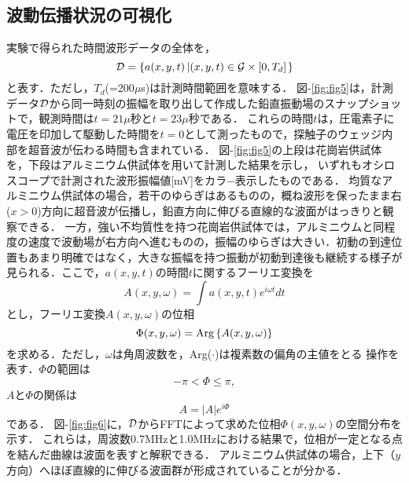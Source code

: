 ﻿%
\subsection{波動伝播状況の可視化}
実験で得られた時間波形データの全体を，
\begin{equation}
	{\cal D}=\left\{
		a(x,y,t)\left| (x,y,t)\in {\cal G}\times [0,T_d] \right.
	\right\}
	\label{eqn:dataset}
\end{equation}
と表す．ただし，$T_d$(=200$\mu$s)は計測時間範囲を意味する．
図-\ref{fig:fig5}は，計測データ$\cal D$から同一時刻の振幅を取り出して作成した鉛直振動場のスナップショットで，観測時間は$t=21\mu$秒と$t=23\mu$秒である．
これらの時間$t$は，圧電素子に電圧を印加して駆動した時間を$t=0$として測ったもので，探触子のウェッジ内部を超音波が伝わる時間も含まれている．
図-\ref{fig:fig5}の上段は花崗岩供試体を，下段はアルミニウム供試体を用いて計測した結果を示し，
いずれもオシロスコープで計測された波形振幅値[mV]をカラ−表示したものである．
均質なアルミニウム供試体の場合，若干のゆらぎはあるものの，概ね波形を保ったまま右($x>0$)方向に超音波が伝播し，鉛直方向に伸びる直線的な波面がはっきりと観察できる．
一方，強い不均質性を持つ花崗岩供試体では，アルミニウムと同程度の速度で波動場が右方向へ進むものの，振幅のゆらぎは大きい．初動の到達位置もあまり明確ではなく，大きな振幅を持つ振動が初動到達後も継続する様子が見られる．ここで，$a(x,y,t)$の時間$t$に関するフーリエ変換を
\begin{equation}
	A(x,y,\omega)=\int a(x,y,t)e^{i\omega t} dt
	\label{eqn:Fourier_t}
\end{equation}
とし，フーリエ変換$A(x,y,\omega)$の位相
\begin{equation}
	\Phi(x,y,\omega)={\rm Arg}\left\{ A(x,y,\omega) \right\}
	\label{eqn:def_Phi}
\end{equation}
を求める．ただし，$\omega$は角周波数を，Arg($\cdot$)は複素数の偏角の主値をとる
操作を表す．$\Phi$の範囲は
\begin{equation}
	-\pi < \Phi \leq \pi, 
	\label{eqn:dom_phi}
\end{equation}
$A$と$\Phi$の関係は
\begin{equation}
	A=\left| A \right|e^{i\Phi}
	\label{eqn:phi2A}
\end{equation}
である．
図-\ref{fig:fig6}に，$\cal D$からFFTによって求めた位相$\Phi(x,y,\omega)$の空間分布を示す．
これらは，周波数0.7MHzと1.0MHzにおける結果で，位相が一定となる点を結んだ曲線は波面を表すと解釈できる．
アルミニウム供試体の場合，上下（$y$方向）へほぼ直線的に伸びる波面群が形成されていることが分かる．
